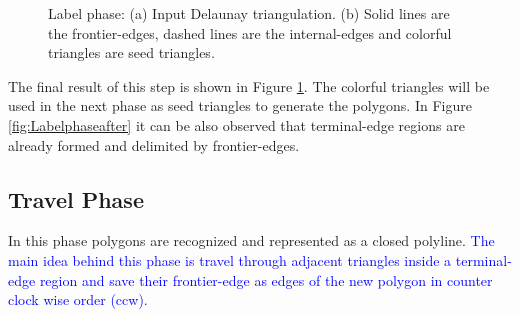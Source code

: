 \documentclass[pdflatex,sn-mathphys]{sn-jnl}%
\theoremstyle{thmstyleone}%
\theoremstyle{thmstyletwo}%
\theoremstyle{thmstylethree}%
\begin{document}
\begin{figure}[h]
\centering     %
{} \hspace{0.5cm} 
\caption{Label phase: (a) Input Delaunay triangulation. (b) Solid lines are the frontier-edges, dashed lines are the internal-edges and colorful triangles are seed triangles. }
\label{figs:label_phase} 
\end{figure}

The final result of this step is shown in Figure \ref{figs:label_phase}. The colorful triangles will be used in the next phase as seed triangles to generate the polygons.  In Figure \ref{fig:Labelphaseafter} it can be also observed that terminal-edge regions are already formed and delimited by frontier-edges. 




\subsection{Travel Phase}
\label{subsec:Travelpohase}

In this phase polygons are recognized and represented as a closed polyline.  \textcolor{blue}{The main idea behind this phase is travel through adjacent triangles inside a terminal-edge region and save their frontier-edge as edges of the new polygon in counter clock wise order (ccw).}%
\end{document}
